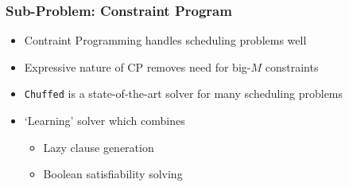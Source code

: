 \documentclass{beamer}
\begin{document}
\begin{frame}
\frametitle{Sub-Problem: Constraint Program}
\begin{itemize}
	\item Contraint Programming handles scheduling problems well\vspace{2mm}\pause
	\item Expressive nature of CP removes need for big-$M$ constraints\vspace{2mm}\pause
	\item {\tt Chuffed} is a state-of-the-art solver for many scheduling problems\vspace{2mm}\pause
	\item `Learning' solver which combines\vspace{2mm}
	\begin{itemize}
		\item Lazy clause generation\vspace{1mm}
		\item Boolean satisfiability solving\vspace{1mm}
	\end{itemize}
\end{itemize}
\end{frame}
\end{document}
